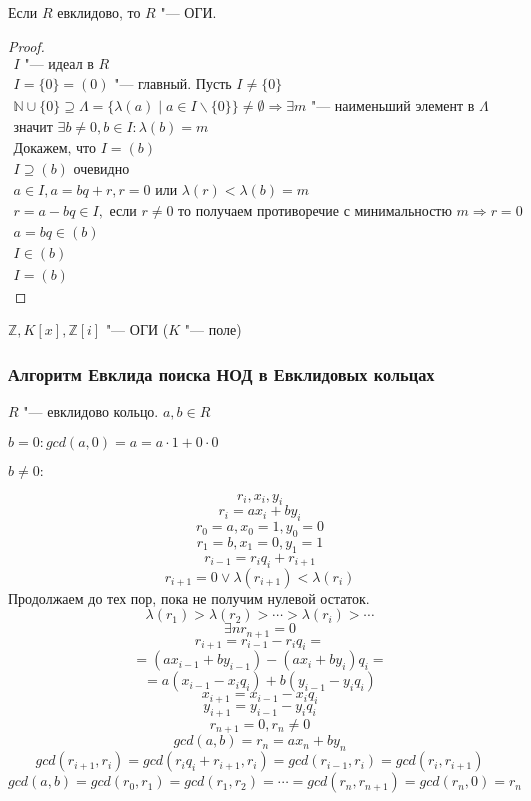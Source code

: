 \begin{theorem}
	Если $R$ евклидово, то $R$ "--- ОГИ.
\end{theorem}

\begin{proof}
	\begin{gather*}
		I \text{ "--- идеал в } R\\
		I = \{0\} = \left(0\right) \text{ "--- главный. Пусть } I \neq \{0\}\\
		\mathbb{N} \cup \{0\} \supseteq \Lambda = \{\lambda\left(a\right) \mid a \in I \smallsetminus \{0\} \} \neq \emptyset \Rightarrow 
		\exists m \text{ "--- наименьший элемент в } \Lambda \\
		\text{значит } \exists b \neq 0, b \in I \colon \lambda\left(b\right) = m\\
		\text{Докажем, что } I = \left(b\right) \\
		I \supseteq \left(b\right) \text{ очевидно} \\
		a \in I, a = bq + r, r = 0 \text{ или } \lambda\left(r\right) < \lambda\left(b\right) = m\\
		r = a - bq \in I, \text{ если } r \neq 0 \text{ то получаем противоречие с минимальностю } m \Rightarrow r = 0\\
		a = bq \in\left(b\right) \\
		I \in \left(b\right) \\
		I = \left(b\right)
	\end{gather*}
\end{proof}

\begin{conseq}
	$\mathbb{Z}, K\left[x\right], \mathbb{Z}\left[i\right] $ "--- ОГИ ($K$ "--- поле)
\end{conseq}

\subsubsection{Алгоритм Евклида поиска НОД в Евклидовых кольцах}
$R$ "--- евклидово кольцо. $a, b \in R$

$b = 0\colon gcd(a, 0) = a = a \cdot 1 + 0 \cdot 0$

$b \ne 0:$

$$r_i, x_i, y_i$$
$$r_i = ax_i + by_i$$
$$r_0 = a, x_0 = 1, y_0 = 0$$
$$r_1 = b, x_1 = 0, y_1 = 1$$
$$r_{i - 1} = r_iq_i + r_{i + 1}$$
$$r_{i + 1} = 0 \vee \lambda(r_{i + 1}) < \lambda(r_{i})$$
Продолжаем до тех пор, пока не получим нулевой остаток. 
$$\lambda(r_1) > \lambda(r_2) > \cdots > \lambda(r_i) > \cdots$$
$$\exists n  r_{n + 1} = 0$$
$$r_{i + 1} = r_{i - 1} - r_{i}q_{i} = $$
$$= (ax_{i - 1} + by_{i - 1}) - (ax_{i} + by_{i})q_{i} = $$
$$=a(x_{i - 1} - x_iq_i) + b(y_{i - 1} - y_iq_i)$$
$$x_{i + 1} = x_{i - 1} - x_iq_i$$
$$y_{i + 1} = y_{i - 1} - y_iq_i$$
$$r_{n + 1} = 0, r_n \ne 0$$
$$gcd(a, b) = r_n = ax_n + by_n$$
$$gcd(r_{i + 1}, r_i) = gcd(r_iq_i + r_{i + 1}, r_i) = gcd(r_{i - 1}, r_i) = gcd(r_i, r_{i + 1})$$
$$gcd(a, b) = gcd(r_0, r_1) = gcd(r_1, r_2) = \cdots = gcd(r_n, r_{n + 1}) = gcd(r_n, 0) = r_n$$

